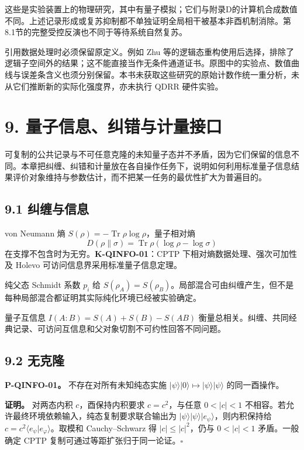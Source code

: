 \documentclass[
  11pt,
  oneside]{book}
\begin{document}
这些是实验装置上的物理研究，其中有量子模拟；它们与附录D的计算机合成数值不同。上述记录形成或复苏抑制都不单独证明全局相干被基本非酉机制消除。第8.1节的完整受控反演也不同于等待系统自然复苏。

引用数据处理时必须保留原定义。例如 Zhu
等的逻辑态重构使用后选择，排除了逻辑子空间外的结果；这不能直接当作无条件通道证书。原图中的实验点、数值曲线与误差条含义也须分别保留。本书未获取这些研究的原始计数作统一重分析，未从它们推断新的实际化强度界，亦未执行
QDRR 硬件实验。

\chapter{9. 量子信息、纠错与计量接口}\label{ch-9}\hypertarget{ch-9}{}

可复制的公共记录与不可任意克隆的未知量子态并不矛盾，因为它们保留的信息不同。本章把纠缠、纠错和计量放在各自操作任务下，说明如何利用标准量子信息结果评价对象维持与参数估计，而不把某一任务的最优性扩大为普遍目的。

\section{9.1 纠缠与信息}

von Neumann 熵 \(S(\rho)=-\operatorname{Tr}\rho\log\rho\)，量子相对熵 \[
D(\rho\|\sigma)=\operatorname{Tr}\rho(\log\rho-\log\sigma)
\] 在支撑不包含时为无穷。\textbf{K-QINFO-01}：CPTP
下相对熵数据处理、强次可加性及 Holevo 可访问信息界采用标准量子信息定理。

纯父态 Schmidt 系数 \(p_i\) 给
\(S(\rho_A)=S(\rho_B)\)。局部混合可由纠缠产生，但不是每种局部混合都证明其实际纯化环境已经被实验确定。

量子互信息 \(I(A:B)=S(A)+S(B)-S(AB)\)
衡量总相关。纠缠、共同经典记录、可访问互信息和父对象切割不可约性回答不同问题。

\section{9.2 无克隆}

\protect\hypertarget{p-qinfo-01}{}{}

\textbf{P-QINFO-01。} 不存在对所有未知纯态实施
\(|\psi\rangle|0\rangle\mapsto|\psi\rangle|\psi\rangle\) 的同一酉操作。

\textbf{证明。} 对两态内积 \(c\)，酉保持内积要求 \(c=c^2\)，与任意
\(0<|c|<1\) 不相容。若允许最终环境依赖输入，纯态复制要求联合输出为
\(|\psi\rangle|\psi\rangle|e_\psi\rangle\)，则内积保持给
\(c=c^2\langle e_\psi|e_\varphi\rangle\)。取模和 Cauchy--Schwarz 得
\(|c|\le|c|^2\)，仍与 \(0<|c|<1\) 矛盾。一般确定 CPTP
复制可通过等距扩张归于同一论证。\(\square\)
\end{document}
